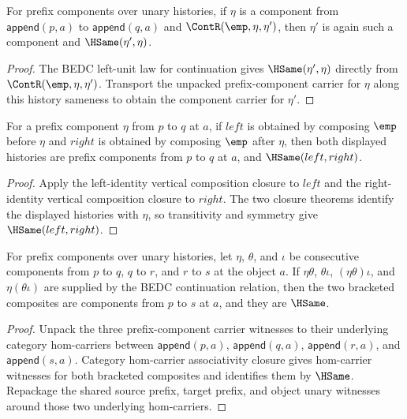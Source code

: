 \begin{theorem}
\label{thm:nattrans-prefix-component-vert-comp-left-identity-closed}
For prefix components over unary histories, if $\eta$ is a component from
$\mathsf{append}(p,a)$ to $\mathsf{append}(q,a)$ and
$\ContR(\emp,\eta,\eta')$, then $\eta'$ is again such a component and
$\HSame(\eta',\eta)$.
\end{theorem}
\begin{proof}
The BEDC left-unit law for continuation gives $\HSame(\eta',\eta)$ directly
from $\ContR(\emp,\eta,\eta')$. Transport the unpacked prefix-component carrier
for $\eta$ along this history sameness to obtain the component carrier for
$\eta'$.
\end{proof}

\begin{theorem}
\label{thm:nattrans-prefix-component-vert-comp-identity-square-closed}
For a prefix component $\eta$ from $p$ to $q$ at $a$, if $left$ is obtained by
composing $\emp$ before $\eta$ and $right$ is obtained by composing $\emp$
after $\eta$, then both displayed histories are prefix components from $p$ to
$q$ at $a$, and $\HSame(left,right)$.
\end{theorem}
\begin{proof}
Apply the left-identity vertical composition closure to $left$ and the
right-identity vertical composition closure to $right$. The two closure
theorems identify the displayed histories with $\eta$, so transitivity and
symmetry give $\HSame(left,right)$.
\end{proof}

\begin{theorem}
\label{thm:nattrans-prefix-component-carrier-vert-comp-assoc-closed}
For prefix components over unary histories, let \(\eta\), \(\theta\), and
\(\iota\) be consecutive components from \(p\) to \(q\), \(q\) to \(r\), and
\(r\) to \(s\) at the object \(a\). If \(\eta\theta\), \(\theta\iota\),
\((\eta\theta)\iota\), and \(\eta(\theta\iota)\) are supplied by the BEDC
continuation relation, then the two bracketed composites are components from
\(p\) to \(s\) at \(a\), and they are \(\HSame\).
\end{theorem}
\begin{proof}
Unpack the three prefix-component carrier witnesses to their underlying
category hom-carriers between
\(\mathsf{append}(p,a)\), \(\mathsf{append}(q,a)\),
\(\mathsf{append}(r,a)\), and \(\mathsf{append}(s,a)\). Category hom-carrier
associativity closure gives hom-carrier witnesses for both bracketed
composites and identifies them by \(\HSame\). Repackage the shared source
prefix, target prefix, and object unary witnesses around those two underlying
hom-carriers.
\end{proof}

